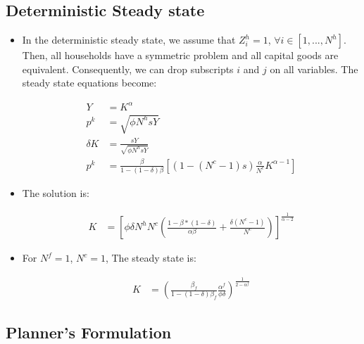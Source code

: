 \documentclass[11pt,english]{article}
\begin{document}
\subsection{Deterministic Steady state}

	\begin{itemize}

	\item In the deterministic steady state, we assume that $Z^h_{i}=1$,  $\forall i \in [1,...,N^h]$. Then, all households have a symmetric problem and all capital goods are equivalent. Consequently, we can drop subscripts $i$ and $j$ on all variables. The steady state equations become:
	
	\begin{align*}
	Y & =  	K^{\alpha}  \\
	p^k & = \sqrt{\phi N^h s Y}\\
	\delta K & = \frac{sY}{ \sqrt{\phi N^h s Y}}\\
	p^k & =\frac{\beta}{1-(1-\delta)\beta} \left[(1-(N^c-1) s)\frac{\alpha}{N^c} K^{\alpha-1}\right]  
	\end{align*}
	
	\item The solution is: 
	
	\begin{align*}
	K & =\left[\phi \delta  N^h N^c \left( \frac{1-\beta*(1-\delta)}{\alpha \beta} + \frac{\delta(N^c-1)}{N^c} \right) \right]^{\frac{1}{\alpha-2} } 
	\end{align*}
	
	\item  For $N^f=1$, $N^c=1$, The steady state is:
	
	\begin{align*}
	K & =\left(\frac{ \beta_f}{1-(1-\delta)\beta_f}  \frac{\alpha^f}{\phi \delta} \right)^{\frac{1}{2-\alpha^f}}  
	\end{align*}
	
\end{itemize}

\subsection{Planner's Formulation}
\end{document}
